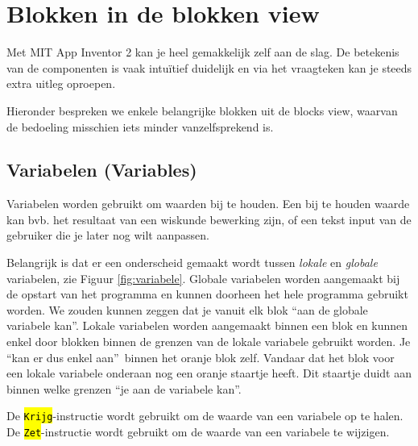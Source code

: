 \section{Blokken in de blokken view}
\label{sec:Mod2_Sec2}
%
Met MIT App Inventor 2 kan je heel gemakkelijk zelf aan de slag. De betekenis van de componenten is vaak intu\"itief duidelijk en via het vraagteken kan je steeds extra uitleg oproepen. 

Hieronder bespreken we enkele belangrijke blokken uit de blocks view, waarvan de bedoeling misschien iets minder vanzelfsprekend is.

\subsection{Variabelen (Variables)}
Variabelen worden gebruikt om waarden bij te houden. Een bij te houden waarde kan bvb. het resultaat van een wiskunde bewerking zijn, of een tekst input van de gebruiker die je later nog wilt aanpassen. 

Belangrijk is dat er een onderscheid gemaakt wordt tussen \emph{lokale} en \emph{globale} variabelen, zie Figuur \ref{fig:variabele}. Globale variabelen worden aangemaakt bij de opstart van het programma en kunnen doorheen het hele programma gebruikt worden. We zouden kunnen zeggen dat je vanuit elk blok \textquotedblleft aan de globale variabele kan\textquotedblright.
Lokale variabelen worden aangemaakt binnen een blok en kunnen enkel door blokken binnen de grenzen van de lokale variabele gebruikt worden. Je \textquotedblleft kan er dus enkel aan\textquotedblright \ binnen het oranje blok zelf. Vandaar dat het blok voor een lokale variabele onderaan nog een oranje staartje heeft. Dit staartje duidt aan binnen welke grenzen \textquotedblleft je aan de variabele kan\textquotedblright.


De \hl{\texttt{Krijg}}-instructie wordt gebruikt om de waarde van een variabele op te halen. De \hl{\texttt{Zet}}-instructie wordt gebruikt om de waarde van een variabele te wijzigen.

